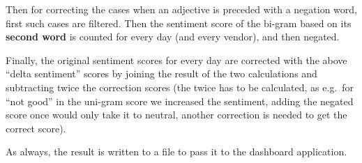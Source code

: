 \documentclass[]{article}
\begin{document}
Then for correcting the cases when an adjective is preceded with a
negation word, first such cases are filtered. Then the sentiment score
of the bi-gram based on its \textbf{second word} is counted for every
day (and every vendor), and then negated.

Finally, the original sentiment scores for every day are corrected with
the above ``delta sentiment'' scores by joining the result of the two
calculations and subtracting twice the correction scores (the twice has
to be calculated, as e.g.~for ``not good'' in the uni-gram score we
increased the sentiment, adding the negated score once would only take
it to neutral, another correction is needed to get the correct score).

As always, the result is written to a file to pass it to the dashboard
application.
\end{document}
